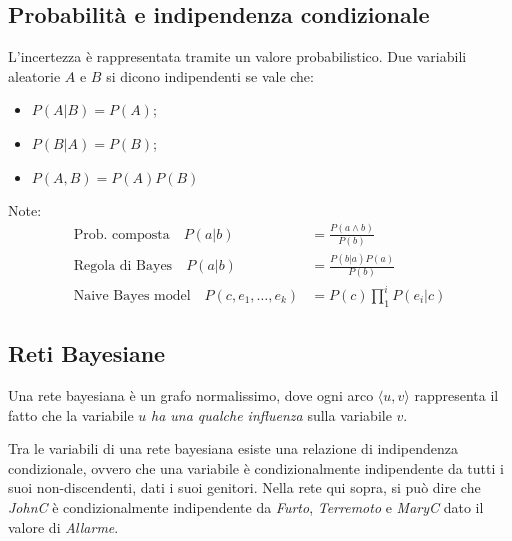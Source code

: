 \documentclass[a4paper, 11pt]{article}
\begin{document}
\subsection{Probabilità e indipendenza condizionale}
L'incertezza è rappresentata tramite un valore probabilistico. 
Due variabili aleatorie $A$ e $B$ si dicono indipendenti se vale che: \begin{itemize}
	\item $P(A \vert B) = P(A) $;
	\item $P(B \vert A) = P(B) $;
	\item $P(A,B) = P(A)P(B)$
\end{itemize}


Note:\begin{align*}
	\text{Prob. composta} \quad P(a \vert b) &= \frac{P(a \wedge b)}{P(b)} \\
	\text{Regola di Bayes} \quad P(a \vert b) &= \frac{P(b \vert a) P(a)}{P(b)} \\
	\text{Naive Bayes model} \quad P(c, e_1, \dots, e_k) &= P(c) \prod_{1}^{i} P(e_i \vert c)
\end{align*}

\subsection{Reti Bayesiane}
Una rete bayesiana è un grafo normalissimo, dove ogni arco $\langle u, v\rangle$ rappresenta il fatto che la variabile $u$ \emph{ha una qualche influenza} sulla variabile $v$.

\begin{center}
\end{center}

Tra le variabili di una rete bayesiana esiste una relazione di indipendenza condizionale, ovvero che una variabile è condizionalmente indipendente da tutti i suoi non-discendenti, dati i suoi genitori. Nella rete qui sopra, si può dire che \textit{JohnC} è condizionalmente indipendente da \textit{Furto}, \textit{Terremoto} e \textit{MaryC} dato il valore di \textit{Allarme}.
\end{document}
